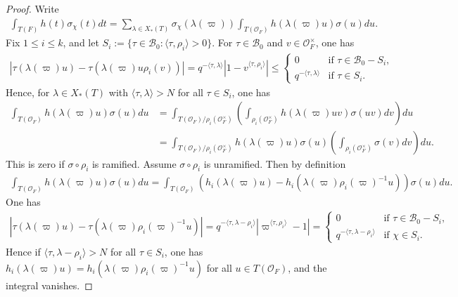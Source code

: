 \documentclass[10pt]{amsart}
\theoremstyle{definition}
\numberwithin{equation}{section}
\numberwithin{equation}{subsection}
\begin{document}
\begin{proof}
Write
\begin{align*}
    \int_{T(F)} h(t)\sigma_\chi(t)dt = \sum_{\lambda\in X_*(T)} \sigma_\chi(\lambda(\varpi)) \int_{T(\mathcal{O}_F)} h(\lambda(\varpi)u) \sigma(u)du.
\end{align*}
Fix $1\le i\le k$, and let $S_i := \{\tau\in\mathcal{B}_0: \langle\tau,\rho_i\rangle>0\}$. For $\tau\in \mathcal{B}_0$ and $v\in \mathcal{O}_F^\times$, one has
\begin{align*}
    |\tau(\lambda(\varpi)u) - \tau(\lambda(\varpi) u \rho_i(v))|= q^{-\langle \tau,\lambda\rangle} |1-v^{\langle\tau,\rho_i\rangle}| \le \left\{\begin{array}{ll}
        0 &\textrm{if }\tau\in\mathcal{B}_0-S_i,  \\
        q^{-\langle\tau,\lambda\rangle} &\textrm{if }\tau\in S_i.
    \end{array}\right.
\end{align*}
Hence, for $\lambda\in X_*(T)$ with $\langle\tau,\lambda\rangle>N$ for all $\tau\in S_i$, one has
\begin{align*}
    \int_{T(\mathcal{O}_F)} h(\lambda(\varpi)u) \sigma(u)du &= \int_{T(\mathcal{O}_F)/\rho_i(\mathcal{O}_F^\times)}\left(\int_{\rho_i(\mathcal{O}_F^\times)} h(\lambda(\varpi)uv) \sigma(uv) dv\right)du\\
    &=\int_{T(\mathcal{O}_F)/\rho_i(\mathcal{O}_F^\times)} h(\lambda(\varpi)u)\sigma(u)\left(\int_{\rho_i(\mathcal{O}_F^\times)}\sigma(v) dv\right)du.
\end{align*}
This is zero if $\sigma\circ\rho_i$ is ramified. Assume $\sigma\circ\rho_i$ is unramified. Then by definition
\begin{align*}
    \int_{T(\mathcal{O}_F)} h(\lambda(\varpi)u) \sigma(u)du = \int_{T(\mathcal{O}_F)} \left(h_i(\lambda(\varpi)u)-h_i(\lambda(\varpi)\rho_i(\varpi)^{-1}u)\right)\sigma(u)du.
\end{align*}
One has 
\begin{align*}
    |\tau(\lambda(\varpi)u) - \tau(\lambda(\varpi)\rho_i(\varpi)^{-1}u)| = q^{-\langle\tau,\lambda-\rho_i\rangle} |\varpi^{\langle\tau,\rho_i\rangle} - 1| = \left\{\begin{array}{ll}
        0 &\text{if }\tau\in\mathcal{B}_0-S_i,  \\
        q^{-\langle\tau,\lambda-\rho_i\rangle} &\text{if }\chi\in S_i.
    \end{array}\right.
\end{align*}
Hence if $\langle\tau,\lambda-\rho_i\rangle>N$ for all $\tau\in S_i$, one has $h_i(\lambda(\varpi)u) = h_i(\lambda(\varpi)\rho_i(\varpi)^{-1}u)$ for all $u\in T(\mathcal{O}_F)$, and the integral vanishes.


\end{proof}
\end{document}
